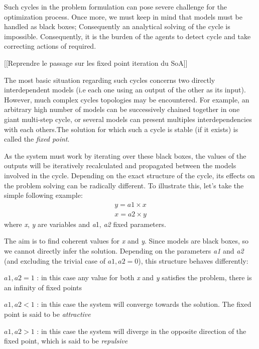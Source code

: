Such cycles in the problem formulation can pose severe challenge for the optimization process. Once more, we must keep in mind that models must be handled as black boxes; Consequently an analytical solving of the cycle is impossible. Consequently, it is the burden of the agents to detect cycle and take correcting actions of required.

[[Reprendre le passage sur les fixed point iteration du SoA]]

The most basic situation regarding such cycles concerns two directly interdependent models (i.e each one using an output of the other as its input). However, much complex cycles topologies may be encountered. For example, an arbitrary high number of models can be successively chained together in one giant multi-step cycle, or several models can present multiples interdependencies with each others.The solution for which such a cycle is stable (if it exists) is called the \emph{fixed point}.

As the system must work by iterating over these black boxes, the values of the outputs will be iteratively recalculated and propagated between the models involved in the cycle. Depending on the exact structure of the cycle, its effects on the problem solving can be radically different. To illustrate this, let's take the simple following example:
\begin{gather*}
y = a1 \times x \\
x = a2 \times y
\end{gather*}
where \emph{x}, \emph{y} are variables and \emph{a}1, \emph{a2} fixed parameters.
 
The aim is to find coherent values for \emph{x} and \emph{y}. Since models are black boxes, so we cannot directly infer the solution. Depending on the parameters \emph{a1} and \emph{a2} (and excluding the trivial case of \(a1, a2  = 0\)), this structure behaves differently: 
 
\begin{compactitem}
\item \(a1, a2 = 1\) : in this case any value for both \emph{x} and \emph{y} satisfies the problem, there is an infinity of fixed points
\item \(a1, a2 < 1\) : in this case the system will converge towards the solution. The fixed point is said to be \emph{attractive}
\item \(a1, a2 > 1\) : in this case the system will diverge in the opposite direction of the fixed point, which is said to be \emph{repulsive}
\end{compactitem}

